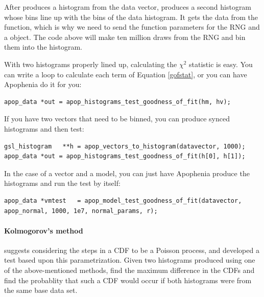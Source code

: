 After  produces a histogram from the
data vector,  produces a second histogram
whose bins line up with the bins of the data histogram. It gets the data
from the  function, which is why we need to
send the function parameters for the RNG and a 
object. The code above will make ten million draws from the RNG and bin
them into the  histogram.

With two histograms properly lined up, calculating the $\chi^2$
statistic is easy. You can write a  loop to calculate each
term of Equation \ref{gofstat}, or you can have Apophenia do it for you:
\begin{lstlisting}
apop_data *out = apop_histograms_test_goodness_of_fit(hm, hv);
\end{lstlisting}


If you have two vectors that need to be binned, you can produce 
synced histograms and then test:
\begin{lstlisting}
gsl_histogram   **h = apop_vectors_to_histogram(datavector, 1000);
apop_data *out = apop_histograms_test_goodness_of_fit(h[0], h[1]);
\end{lstlisting}
In the case of a vector and a model, you can just have
Apophenia produce the histograms and run the test by itself:
\begin{lstlisting}
apop_data *vmtest   = apop_model_test_goodness_of_fit(datavector, apop_normal, 1000, 1e7, normal_params, r);
\end{lstlisting}


\paragraph{Kolmogorov's method} \citet{kolmogorov:test} suggests
considering the steps in a CDF to be a Poisson process, and developed a
test based upon this parametrization. Given two histograms produced using one of
the above-men\-tioned methods,  find the
maximum difference in the CDFs and find the probablity that such a CDF
would occur if both histograms were from the same base data set.

